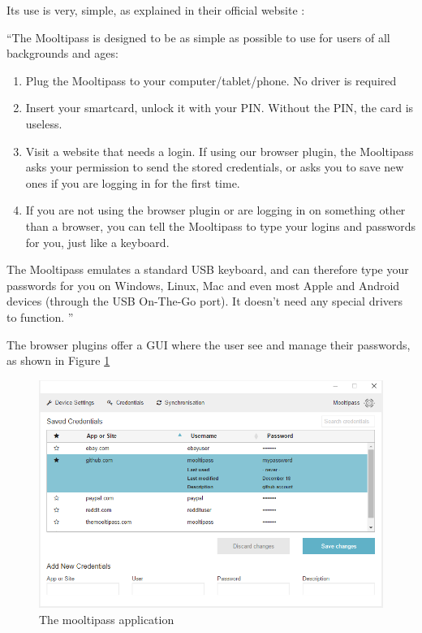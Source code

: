 Its use is very, simple, as explained in their official website \cite{mooltipass}:

``The Mooltipass is designed to be as simple as possible to use for users of all backgrounds and ages:
\begin{enumerate}
\setlength\itemsep{-3pt}

\item Plug the Mooltipass to your computer/tablet/phone. No driver is required
\item Insert your smartcard, unlock it with your PIN. Without the PIN, the card is useless.
\item Visit a website that needs a login. If using our browser plugin, the Mooltipass asks your permission to send the stored credentials, or asks you to save new ones if you are logging in for the first time.
\item If you are not using the browser plugin or are logging in on something other than a browser, you can tell the Mooltipass to type your logins and passwords for you, just like a keyboard.
\end{enumerate}

The Mooltipass emulates a standard USB keyboard, and can therefore type your passwords for you on Windows, Linux, Mac and even most Apple and Android devices (through the USB On-The-Go port). It doesn't need any special drivers to function. ''

The browser plugins offer a GUI where the user see and manage their passwords, as shown in Figure \ref{fig:mpapp}

\begin{figure}[htb]
  \centering
  \captionsetup{justification=centering}
  \centerline{\includegraphics[width=0.9\columnwidth]{chapters/figures/related/mpapp.png}}
  \caption{The mooltipass application}
  \label{fig:mpapp}
\end{figure}

